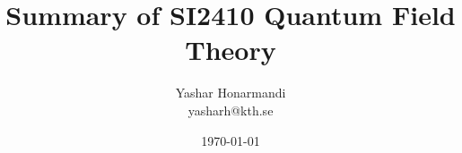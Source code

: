 \documentclass[a4paper, 11pt]{article}
\title{Summary of SI2410 Quantum Field Theory}
\author{Yashar Honarmandi \\ yasharh@kth.se}
\date{\today}
\begin{document}
\maketitle

\begin{abstract}
	
\end{abstract}

\thispagestyle{empty}

\newpage

\tableofcontents

\newpage



\end{document}
